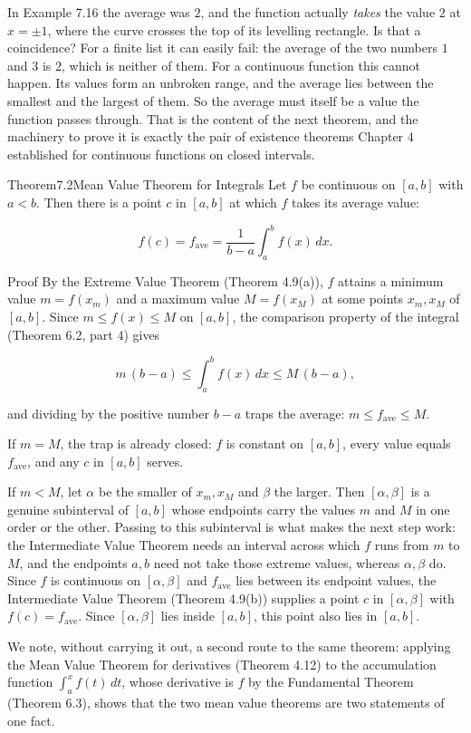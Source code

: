 \documentclass[a4paper,12pt,oneside]{memoir}
\begin{document}
In Example 7.16 the average was \(2\), and the function actually \emph{takes} the value \(2\) at \(x = \pm 1\), where the curve crosses the top of its levelling rectangle. Is that a coincidence? For a finite list it can easily fail: the average of the two numbers \(1\) and \(3\) is \(2\), which is neither of them. For a continuous function this cannot happen. Its values form an unbroken range, and the average lies between the smallest and the largest of them. So the average must itself be a value the function passes through. That is the content of the next theorem, and the machinery to prove it is exactly the pair of existence theorems Chapter 4 established for continuous functions on closed intervals.

\begin{envtheorem}{Theorem}{7.2}{Mean Value Theorem for Integrals}
Let \(f\) be continuous on \([a, b]\) with \(a < b\). Then there is a point \(c\) in \([a, b]\) at which \(f\) takes its average value:

\[ f(c) = f_{\text{ave}} = \frac{1}{b - a}\int_{a}^{b} f(x)\,dx. \]
\end{envtheorem}
\begin{envproof}{Proof}{}{}
By the Extreme Value Theorem (Theorem 4.9(a)), \(f\) attains a minimum value \(m = f(x_m)\) and a maximum value \(M = f(x_M)\) at some points \(x_m, x_M\) of \([a, b]\). Since \(m \le f(x) \le M\) on \([a, b]\), the comparison property of the integral (Theorem 6.2, part 4) gives

\[ m\,(b - a) \le \int_{a}^{b} f(x)\,dx \le M\,(b - a), \]

and dividing by the positive number \(b - a\) traps the average: \(m \le f_{\text{ave}} \le M\).

If \(m = M\), the trap is already closed: \(f\) is constant on \([a, b]\), every value equals \(f_{\text{ave}}\), and any \(c\) in \([a, b]\) serves.

If \(m < M\), let \(\alpha\) be the smaller of \(x_m, x_M\) and \(\beta\) the larger. Then \([\alpha, \beta]\) is a genuine subinterval of \([a, b]\) whose endpoints carry the values \(m\) and \(M\) in one order or the other. Passing to this subinterval is what makes the next step work: the Intermediate Value Theorem needs an interval across which \(f\) runs from \(m\) to \(M\), and the endpoints \(a, b\) need not take those extreme values, whereas \(\alpha, \beta\) do. Since \(f\) is continuous on \([\alpha, \beta]\) and \(f_{\text{ave}}\) lies between its endpoint values, the Intermediate Value Theorem (Theorem 4.9(b)) supplies a point \(c\) in \([\alpha, \beta]\) with \(f(c) = f_{\text{ave}}\). Since \([\alpha, \beta]\) lies inside \([a, b]\), this point also lies in \([a, b]\). \qedmark
\end{envproof}
We note, without carrying it out, a second route to the same theorem: applying the Mean Value Theorem for derivatives (Theorem 4.12) to the accumulation function \(\int_{a}^{x} f(t)\,dt\), whose derivative is \(f\) by the Fundamental Theorem (Theorem 6.3), shows that the two mean value theorems are two statements of one fact.
\end{document}
